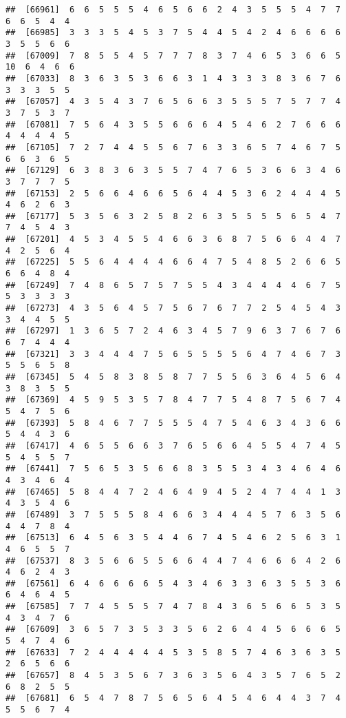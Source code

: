 \documentclass[
]{book}
\begin{document}
\begin{verbatim}
##  [66961]  6  6  5  5  5  4  6  5  6  6  2  4  3  5  5  5  4  7  7  6  6  5  4  4
##  [66985]  3  3  3  5  4  5  3  7  5  4  4  5  4  2  4  6  6  6  6  3  5  5  6  6
##  [67009]  7  8  5  5  4  5  7  7  7  8  3  7  4  6  5  3  6  6  5 10  6  4  6  6
##  [67033]  8  3  6  3  5  3  6  6  3  1  4  3  3  3  8  3  6  7  6  3  3  3  5  5
##  [67057]  4  3  5  4  3  7  6  5  6  6  3  5  5  5  7  5  7  7  4  3  7  5  3  7
##  [67081]  7  5  6  4  3  5  5  6  6  6  4  5  4  6  2  7  6  6  6  4  4  4  4  5
##  [67105]  7  2  7  4  4  5  5  6  7  6  3  3  6  5  7  4  6  7  5  6  6  3  6  5
##  [67129]  6  3  8  3  6  3  5  5  7  4  7  6  5  3  6  6  3  4  6  3  7  7  7  5
##  [67153]  2  5  6  6  4  6  6  5  6  4  4  5  3  6  2  4  4  4  5  4  6  2  6  3
##  [67177]  5  3  5  6  3  2  5  8  2  6  3  5  5  5  5  6  5  4  7  7  4  5  4  3
##  [67201]  4  5  3  4  5  5  4  6  6  3  6  8  7  5  6  6  4  4  7  4  2  5  6  4
##  [67225]  5  5  6  4  4  4  4  6  6  4  7  5  4  8  5  2  6  6  5  6  6  4  8  4
##  [67249]  7  4  8  6  5  7  5  7  5  5  4  3  4  4  4  4  6  7  5  5  3  3  3  3
##  [67273]  4  3  5  6  4  5  7  5  6  7  6  7  7  2  5  4  5  4  3  3  4  4  5  5
##  [67297]  1  3  6  5  7  2  4  6  3  4  5  7  9  6  3  7  6  7  6  6  7  4  4  4
##  [67321]  3  3  4  4  4  7  5  6  5  5  5  5  6  4  7  4  6  7  3  5  5  6  5  8
##  [67345]  5  4  5  8  3  8  5  8  7  7  5  5  6  3  6  4  5  6  4  3  8  3  5  5
##  [67369]  4  5  9  5  3  5  7  8  4  7  7  5  4  8  7  5  6  7  4  5  4  7  5  6
##  [67393]  5  8  4  6  7  7  5  5  5  4  7  5  4  6  3  4  3  6  6  5  4  4  3  6
##  [67417]  4  6  5  5  6  6  3  7  6  5  6  6  4  5  5  4  7  4  5  5  4  5  5  7
##  [67441]  7  5  6  5  3  5  6  6  8  3  5  5  3  4  3  4  6  4  6  4  3  4  6  4
##  [67465]  5  8  4  4  7  2  4  6  4  9  4  5  2  4  7  4  4  1  3  4  3  5  4  6
##  [67489]  3  7  5  5  5  8  4  6  6  3  4  4  4  5  7  6  3  5  6  4  4  7  8  4
##  [67513]  6  4  5  6  3  5  4  4  6  7  4  5  4  6  2  5  6  3  1  4  6  5  5  7
##  [67537]  8  3  5  6  6  5  5  6  6  4  4  7  4  6  6  6  4  2  6  4  6  2  4  3
##  [67561]  6  4  6  6  6  6  5  4  3  4  6  3  3  6  3  5  5  3  6  6  4  6  4  5
##  [67585]  7  7  4  5  5  5  7  4  7  8  4  3  6  5  6  6  5  3  5  4  3  4  7  6
##  [67609]  3  6  5  7  3  5  3  3  5  6  2  6  4  4  5  6  6  6  5  5  4  7  4  6
##  [67633]  7  2  4  4  4  4  4  5  3  5  8  5  7  4  6  3  6  3  5  2  6  5  6  6
##  [67657]  8  4  5  3  5  6  7  3  6  3  5  6  4  3  5  7  6  5  2  6  8  2  5  5
##  [67681]  6  5  4  7  8  7  5  6  5  6  4  5  4  6  4  4  3  7  4  5  5  6  7  4

\end{verbatim}
\end{document}
